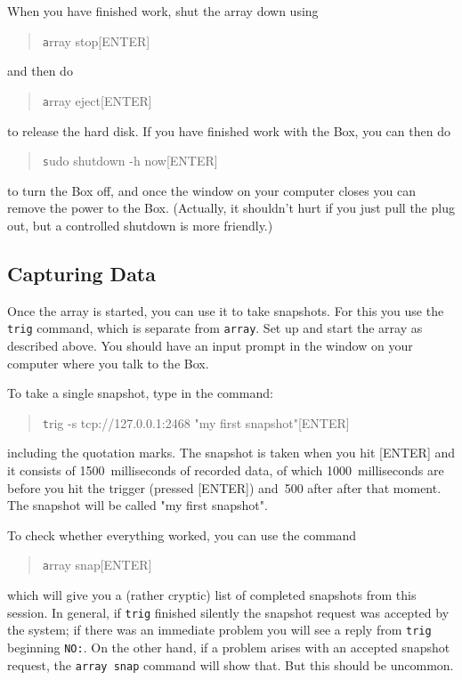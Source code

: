 \documentclass[12pt]{article}
\begin{document}
When you have finished work, shut the array down using
\begin{quotation}\texttt
      array stop[ENTER]
\end{quotation}
and then do
\begin{quotation}\texttt
      array eject[ENTER]
\end{quotation}
to release the hard disk.  If you have finished work with the Box, you
can then do
\begin{quotation}\texttt
      sudo shutdown -h now[ENTER]
\end{quotation}
to turn the Box off, and once the window on your computer closes you
can remove the power to the Box.  (Actually, it shouldn't hurt if you
just pull the plug out, but a controlled shutdown is more friendly.)

\subsection{Capturing Data}

Once the array is started, you can use it to take snapshots.  For this
you use the \texttt{trig} command, which is separate from
\texttt{array}.  Set up and start the array as described above.  You
should have an input prompt in the window on your computer where you
talk to the Box.

To take a single snapshot, type in the command:
\begin{quotation}\texttt
      trig -s tcp://127.0.0.1:2468 "my first snapshot"[ENTER]
\end{quotation}
including the quotation marks.  The snapshot is taken when you hit
[ENTER] and it consists of 1500~milliseconds of recorded data, of
which 1000~milliseconds are before you hit the trigger (pressed
[ENTER]) and~500 after after that moment.  The snapshot will be called
"my first snapshot".

To check whether everything worked, you can use the command
\begin{quotation}\texttt
      array snap[ENTER]
\end{quotation}
which will give you a (rather cryptic) list of completed snapshots
from this session.  In general, if \texttt{trig} finished silently the snapshot
request was accepted by the system; if there was an immediate problem
you will see a reply from \texttt{trig} beginning \texttt{NO:}.  On the other
hand, if a problem arises with an accepted snapshot request, the
\texttt{array snap} command will show that.  But this should be
uncommon.
\end{document}

